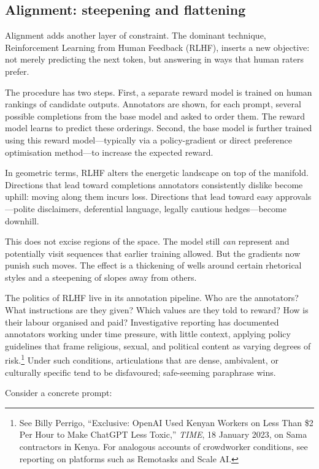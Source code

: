 \documentclass[12pt,a4paper]{article}
\begin{document}
\subsection*{Alignment: steepening and flattening}

Alignment adds another layer of constraint. The dominant technique, Reinforcement Learning from Human Feedback (RLHF), inserts a new objective: not merely predicting the next token, but answering in ways that human raters prefer.

The procedure has two steps. First, a separate reward model is trained on human rankings of candidate outputs. Annotators are shown, for each prompt, several possible completions from the base model and asked to order them. The reward model learns to predict these orderings. Second, the base model is further trained using this reward model---typically via a policy-gradient or direct preference optimisation method---to increase the expected reward.

In geometric terms, RLHF alters the energetic landscape on top of the manifold. Directions that lead toward completions annotators consistently dislike become uphill: moving along them incurs loss. Directions that lead toward easy approvals---polite disclaimers, deferential language, legally cautious hedges---become downhill.

This does not excise regions of the space. The model still \emph{can} represent and potentially visit sequences that earlier training allowed. But the gradients now punish such moves. The effect is a thickening of wells around certain rhetorical styles and a steepening of slopes away from others.

The politics of RLHF live in its annotation pipeline. Who are the annotators? What instructions are they given? Which values are they told to reward? How is their labour organised and paid? Investigative reporting has documented annotators working under time pressure, with little context, applying policy guidelines that frame religious, sexual, and political content as varying degrees of risk.\footnote{See Billy Perrigo, ``Exclusive: OpenAI Used Kenyan Workers on Less Than \$2 Per Hour to Make ChatGPT Less Toxic,'' \emph{TIME}, 18 January 2023, on Sama contractors in Kenya. For analogous accounts of crowdworker conditions, see reporting on platforms such as Remotasks and Scale AI.} Under such conditions, articulations that are dense, ambivalent, or culturally specific tend to be disfavoured; safe-seeming paraphrase wins.

Consider a concrete prompt:
\end{document}
